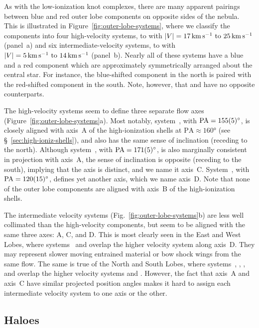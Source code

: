 \documentclass[useAMS, usenatbib]{mnras}
\begin{document}
As with the low-ionization knot complexes,
there are many apparent pairings between blue and red outer lobe components on opposite sides of the nebula.
This is illustrated in Figure~\ref{fig:outer-lobe-systems},
where we classify the components into four high-velocity systems,
 to 
with \(|V| = \text{\SIrange{17}{25}{km.s^{-1}}}\) (panel~a)
and six intermediate-velocity systems,
 to 
with \(|V| = \text{\SIrange{5}{14}{km.s^{-1}}}\) (panel~b).
Nearly all of these systems have a blue and a red component
which are approximately symmetrically arranged about the central star.
For instance, the blue-shifted  component in the north
is paired with the red-shifted  component in the south.
Note, however, that  and  have no opposite counterparts.

The high-velocity systems seem to define three separate flow axes (Figure~\ref{fig:outer-lobe-systems}a).
Most notably, system~, with \(\text{PA} = \ang{155 \pm 5}\),
is closely aligned with axis~A of the high-ionization shells at \(\text{PA} \approx \ang{160}\)
(see \S~\ref{sec:high-ioniz-shells}),
and also has the same sense of inclination (receding to the north).
Although system~, with  \(\text{PA} = \ang{171 \pm 5}\),
is also marginally consistent in projection with axis~A,
the sense of inclination is opposite (receding to the south),
implying that the axis is distinct,
and we name it axis~C.
System~, with  \(\text{PA} = \ang{120 \pm 15}\), defines yet another axis,
which we name axis~D.
Note that none of the outer lobe components are aligned with axis~B of the high-ionization shells.

The intermediate velocity systems (Fig.~\ref{fig:outer-lobe-systems}b)
are less well collimated than the high-velocity components,
but seem to be aligned with the same three axes: A, C, and D.
This is most clearly seen in the East and West Lobes,
where systems~ and  overlap the higher velocity system  along axis~D.
They may represent slower moving entrained material or bow shock wings from the same flow.
The same is true of the North and South Lobes,
where systems~, , , and 
overlap the higher velocity systems  and .
However, the fact that axis~A and axis~C have similar projected position angles
makes it hard to assign each intermediate velocity system to one axis or the other.


\subsection{Haloes}
\label{sec:haloes}
\end{document}
